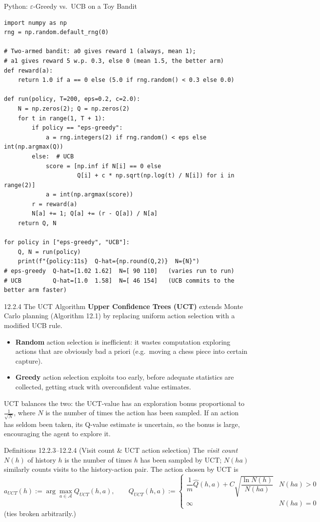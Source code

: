 \documentclass[aspectratio=169,10pt]{beamer}
\newcommand{\Acal}{\mathcal{A}}
\begin{document}
\begin{frame}[fragile]{Python: $\varepsilon$-Greedy vs.\ UCB on a Toy Bandit}
\begin{lstlisting}
import numpy as np
rng = np.random.default_rng(0)

# Two-armed bandit: a0 gives reward 1 (always, mean 1);
# a1 gives reward 5 w.p. 0.3, else 0 (mean 1.5, the better arm)
def reward(a):
    return 1.0 if a == 0 else (5.0 if rng.random() < 0.3 else 0.0)

def run(policy, T=200, eps=0.2, c=2.0):
    N = np.zeros(2); Q = np.zeros(2)
    for t in range(1, T + 1):
        if policy == "eps-greedy":
            a = rng.integers(2) if rng.random() < eps else int(np.argmax(Q))
        else:  # UCB
            score = [np.inf if N[i] == 0 else
                     Q[i] + c * np.sqrt(np.log(t) / N[i]) for i in range(2)]
            a = int(np.argmax(score))
        r = reward(a)
        N[a] += 1; Q[a] += (r - Q[a]) / N[a]
    return Q, N

for policy in ["eps-greedy", "UCB"]:
    Q, N = run(policy)
    print(f"{policy:11s}  Q-hat={np.round(Q,2)}  N={N}")
# eps-greedy  Q-hat=[1.02 1.62]  N=[ 90 110]   (varies run to run)
# UCB         Q-hat=[1.0  1.58]  N=[ 46 154]   (UCB commits to the better arm faster)
\end{lstlisting}
\end{frame}

\begin{frame}{12.2.4 The UCT Algorithm}
\textbf{Upper Confidence Trees (UCT)} extends Monte Carlo planning (Algorithm 12.1) by
replacing uniform action selection with a modified UCB rule.
\begin{itemize}
\item \textbf{Random} action selection is inefficient: it wastes computation exploring
actions that are obviously bad a priori (e.g.\ moving a chess piece into certain capture).
\item \textbf{Greedy} action selection exploits too early, before adequate statistics are
collected, getting stuck with overconfident value estimates.
\end{itemize}
UCT balances the two: the UCT-value has an exploration bonus proportional to
$\frac{1}{\sqrt N}$, where $N$ is the number of times the action has been sampled. If an
action has seldom been taken, its Q-value estimate is uncertain, so the bonus is large,
encouraging the agent to explore it.
\begin{block}{Definitions 12.2.3--12.2.4 (Visit count \& UCT action selection)}
The \emph{visit count} $N(h)$ of history $h$ is the number of times $h$ has been sampled
by UCT; $N(ha)$ similarly counts visits to the history-action pair. The action chosen by
UCT is
$$a_{UCT}(h) := \arg\max_{a\in\Acal} Q_{UCT}(h,a),\qquad
Q_{UCT}(h,a):=\begin{cases}
\dfrac{1}{m}\widehat Q(h,a) + C\sqrt{\dfrac{\ln N(h)}{N(ha)}} & N(ha)>0\\[4pt]
\infty & N(ha)=0
\end{cases}$$
(ties broken arbitrarily.)
\end{block}
\end{frame}
\end{document}

